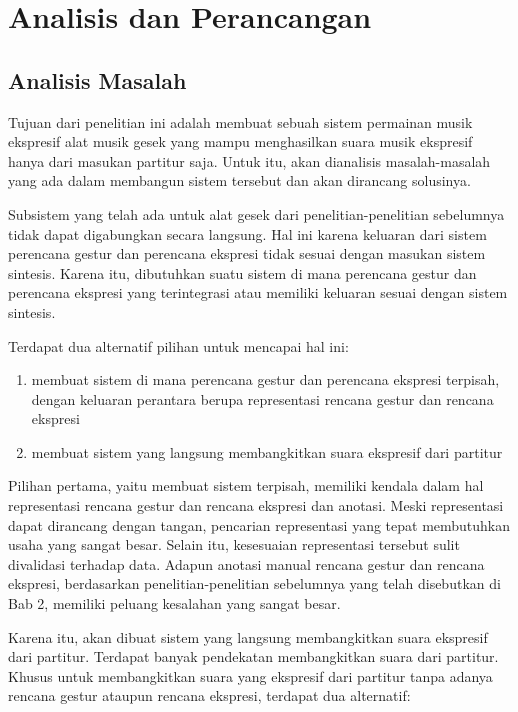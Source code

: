 \chapter{Analisis dan Perancangan}

\section{Analisis Masalah}

Tujuan dari penelitian ini adalah membuat sebuah sistem permainan musik ekspresif alat musik gesek yang mampu menghasilkan suara musik ekspresif hanya dari masukan partitur saja. Untuk itu, akan dianalisis masalah-masalah yang ada dalam membangun sistem tersebut dan akan dirancang solusinya.

Subsistem yang telah ada untuk alat gesek dari penelitian-penelitian sebelumnya tidak dapat digabungkan secara langsung. Hal ini karena keluaran dari sistem perencana gestur dan perencana ekspresi tidak sesuai dengan masukan sistem sintesis. Karena itu, dibutuhkan suatu sistem di mana perencana gestur dan perencana ekspresi yang terintegrasi atau memiliki keluaran sesuai dengan sistem sintesis.

Terdapat dua alternatif pilihan untuk mencapai hal ini:

\begin{enumerate}
	\item membuat sistem di mana perencana gestur dan perencana ekspresi terpisah, dengan keluaran perantara berupa representasi rencana gestur dan rencana ekspresi
	\item membuat sistem yang langsung membangkitkan suara ekspresif dari partitur
\end{enumerate}

Pilihan pertama, yaitu membuat sistem terpisah, memiliki kendala dalam hal representasi rencana gestur dan rencana ekspresi dan anotasi. Meski representasi dapat dirancang dengan tangan, pencarian representasi yang tepat membutuhkan usaha yang sangat besar. Selain itu, kesesuaian representasi tersebut sulit divalidasi terhadap data. Adapun anotasi manual rencana gestur dan rencana ekspresi, berdasarkan penelitian-penelitian sebelumnya yang telah disebutkan di Bab 2, memiliki peluang kesalahan yang sangat besar.

Karena itu, akan dibuat sistem yang langsung membangkitkan suara ekspresif dari partitur. Terdapat banyak pendekatan membangkitkan suara dari partitur. Khusus untuk membangkitkan suara yang ekspresif dari partitur tanpa adanya rencana gestur ataupun rencana ekspresi, terdapat dua alternatif:

